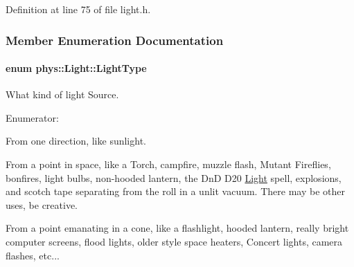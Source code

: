 Definition at line 75 of file light.h.



\subsubsection{Member Enumeration Documentation}
\hypertarget{classphys_1_1Light_aef1be63d57f59f33bf4c66be797009bf}{
\paragraph[{LightType}]{\setlength{\rightskip}{0pt plus 5cm}enum {\bf phys::Light::LightType}}\hfill}
\label{classphys_1_1Light_aef1be63d57f59f33bf4c66be797009bf}


What kind of light Source. 

\begin{Desc}
\item[Enumerator: ]\par
\begin{description}
\item[{\em 
\hypertarget{classphys_1_1Light_aef1be63d57f59f33bf4c66be797009bfac3ba7607dde18593ca9c727b0baf81e3}{
Directional}
\label{classphys_1_1Light_aef1be63d57f59f33bf4c66be797009bfac3ba7607dde18593ca9c727b0baf81e3}
}]From one direction, like sunlight. \item[{\em 
\hypertarget{classphys_1_1Light_aef1be63d57f59f33bf4c66be797009bfa8030594658d86b56e82ac4e4233eeb63}{
Point}
\label{classphys_1_1Light_aef1be63d57f59f33bf4c66be797009bfa8030594658d86b56e82ac4e4233eeb63}
}]From a point in space, like a Torch, campfire, muzzle flash, Mutant Fireflies, bonfires, light bulbs, non-\/hooded lantern, the DnD D20 \hyperlink{classphys_1_1Light}{Light} spell, explosions, and scotch tape separating from the roll in a unlit vacuum. There may be other uses, be creative. \item[{\em 
\hypertarget{classphys_1_1Light_aef1be63d57f59f33bf4c66be797009bfa8b7e7aa3e44d03789a35c40947e99f3a}{
Spotlight}
\label{classphys_1_1Light_aef1be63d57f59f33bf4c66be797009bfa8b7e7aa3e44d03789a35c40947e99f3a}
}]From a point emanating in a cone, like a flashlight, hooded lantern, really bright computer screens, flood lights, older style space heaters, Concert lights, camera flashes, etc... \end{description}
\end{Desc}



